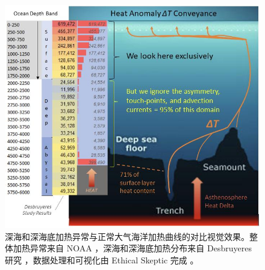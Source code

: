 \documentclass[10pt,twocolumn,letterpaper]{article}
\begin{document}
\begin{figure}[t]
\begin{center}
\includegraphics[width=1\textwidth]{deepsea.jpg}
\end{center}
   \caption{深海和深海底加热异常与正常大气海洋加热曲线的对比视觉效果。整体加热异常来自 NOAA \cite{147}，深海和深海底加热分布来自 Desbruyeres 研究 \cite{132}，数据处理和可视化由 Ethical Skeptic 完成 \cite{129}。}
\label{fig:21}
\end{figure}
\end{document}
